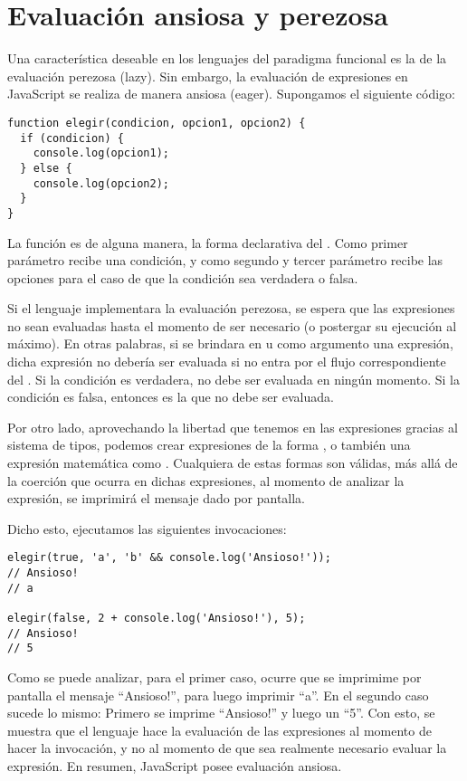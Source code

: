 \section{Evaluación ansiosa y perezosa}

Una característica deseable en los lenguajes del paradigma funcional es la de la evaluación perezosa (lazy). Sin embargo, la evaluación de expresiones en JavaScript se realiza de manera ansiosa (eager). Supongamos el siguiente código:

\begin{lstlisting}[title={Creando una función condicional}]
function elegir(condicion, opcion1, opcion2) {
  if (condicion) {
    console.log(opcion1);
  } else {
    console.log(opcion2);
  }
}
\end{lstlisting}

La función  es de alguna manera, la forma declarativa del . Como primer parámetro recibe una condición, y como segundo y tercer parámetro recibe las opciones para el caso de que la condición sea verdadera o falsa.

Si el lenguaje implementara la evaluación perezosa, se espera que las expresiones no sean evaluadas hasta el momento de ser necesario (o postergar su ejecución al máximo). En otras palabras, si se brindara en  u  como argumento una expresión, dicha expresión no debería ser evaluada si no entra por el flujo correspondiente del . Si la condición es verdadera,  no debe ser evaluada en ningún momento. Si la condición es falsa, entonces es  la que no debe ser evaluada.

Por otro lado, aprovechando la libertad que tenemos en las expresiones gracias al sistema de tipos, podemos crear expresiones de la forma , o también una expresión matemática como . Cualquiera de estas formas son válidas, más allá de la coerción que ocurra en dichas expresiones, al momento de analizar la expresión, se imprimirá el mensaje dado por pantalla.

Dicho esto, ejecutamos las siguientes invocaciones:

\begin{lstlisting}[title={Analizando resultados de las invocaciones}]
elegir(true, 'a', 'b' && console.log('Ansioso!'));
// Ansioso!
// a

elegir(false, 2 + console.log('Ansioso!'), 5);
// Ansioso!
// 5
\end{lstlisting}

Como se puede analizar, para el primer caso, ocurre que se imprimime por pantalla el mensaje "`Ansioso!"', para luego imprimir "`a"'. En el segundo caso sucede lo mismo: Primero se imprime "`Ansioso!"' y luego un "`5"'. Con esto, se muestra que el lenguaje hace la evaluación de las expresiones al momento de hacer la invocación, y no al momento de que sea realmente necesario evaluar la expresión. En resumen, JavaScript posee evaluación ansiosa.

